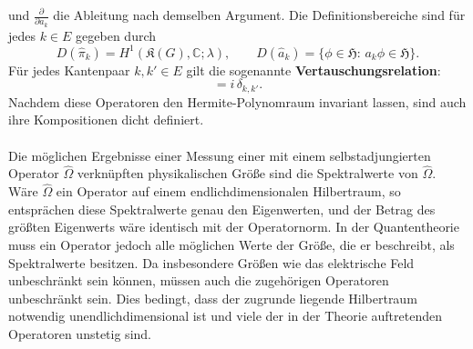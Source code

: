 \documentclass[11pt,a4paper,leqno]{report}
\numberwithin{equation}{chapter}
\begin{document}
und \(\frac{\partial}{\partial a_k}\) die Ableitung nach demselben Argument.  
Die Definitionsbereiche sind für jedes \(k \in E\) gegeben durch
\begin{equation}
	D(\hat{\pi}_k) = H^1(\mathfrak{K}(G), \mathbb{C}; \lambda), \qquad
	D(\hat{a}_k) = \bigl\{\phi\in\mathfrak{H}:\, a_k\phi \in \mathfrak{H}\bigr\}.
\end{equation}
\noindent
Für jedes Kantenpaar \(k, k' \in E\) gilt die sogenannte \textbf{Vertauschungsrelation}:
\begin{equation}
	[\hat{a}(k), \hat{\pi}(k')] = i\,\delta_{k,k'}.
\end{equation}
\noindent
Nachdem diese Operatoren den Hermite-Polynomraum invariant lassen, sind auch ihre Kompositionen 
dicht definiert.
\\
\\
Die möglichen Ergebnisse einer Messung einer mit einem selbstadjungierten Operator 
\(\hat{\Omega}\) verknüpften physikalischen Größe sind die Spektralwerte von \(\hat{\Omega}\).  
Wäre \(\hat{\Omega}\) ein Operator auf einem endlichdimensionalen Hilbertraum, 
so entsprächen diese Spektralwerte genau den Eigenwerten, 
und der Betrag des größten Eigenwerts wäre identisch mit der Operatornorm.  
In der Quantentheorie muss ein Operator jedoch alle möglichen Werte der Größe, die er beschreibt, 
als Spektralwerte besitzen.  
Da insbesondere Größen wie das elektrische Feld unbeschränkt sein können, 
müssen auch die zugehörigen Operatoren unbeschränkt sein.  
Dies bedingt, dass der zugrunde liegende Hilbertraum notwendig unendlichdimensional ist 
und viele der in der Theorie auftretenden Operatoren unstetig sind.
\end{document}

